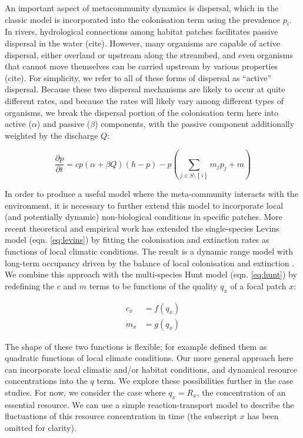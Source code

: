 An important aspect of metacommunity dynamics is dispersal, which in the classic model is incorporated into the colonisation term using the prevalence $p_i$.
In rivers, hydrological connections among habitat patches facilitates passive dispersal in the water (cite).
However, many organisms are capable of active dispersal, either overland or upstream along the streambed, and even organisms that cannot move themselves can be carried upstream by various properties (cite).
For simplicity, we refer to all of these forms of dispersal as “active” dispersal.
Because these two dispersal mechanisms are likely to occur at quite different rates, and because the rates will likely vary among different types of organisms, we break the dispersal portion of the colonisation term here into active ($\alpha$) and passive ($\beta$) components, with the passive component additionally weighted by the discharge $Q$:

\begin{equation}
	\frac{\partial p}{\partial t} = c p(\alpha + \beta Q) \left( h-p \right) - p \left( \sum_{j \in S \setminus \left\{i \right\} }{m_{j}p_j} + m \right)
	\label{eq:metacom}
\end{equation}

In order to produce a useful model where the meta-community interacts with the environment, it is necessary to further extend this model to incorporate local (and potentially dynamic) non-biological conditions in specific patches.
More recent theoretical \autocite{Holt2000,Holt2005} and empirical \autocite{Talluto2017} work has extended the single-species Levins model (eqn. \ref{eq:levins}) by fitting the colonisation and extinction rates as functions of local climatic conditions.
The result is a dynamic range model with long-term occupancy driven by the balance of local colonisation and extinction \autocite{Talluto2017}.
We combine this approach with the multi-species Hunt model (eqn. \ref{eq:hunt}) by redefining the $c$ and $m$ terms to be functions of the quality $q_x$ of a focal patch $x$:

\begin{equation}
\begin{split}
	c_{x} &= f(q_{x}) \label{eq:talluto} \\
	m_{x} &= g(q_{x})
\end{split}
\end{equation}


The shape of these two functions is flexible; for example \textcite{Talluto2017} defined them as quadratic functions of local climate conditions.
Our more general approach here can incorporate local climatic and/or habitat conditions, and dynamical resource concentrations into the $q$ term.
We explore these possibilities further in the case studies.
For now, we consider the case where $q_x = R_x$, the concentration of an essential resource.
We can use a simple reaction-transport model \autocite{Soetaert2009} to describe the fluctuations of this resource concentration in time (the subscript $x$ has been omitted for clarity).


